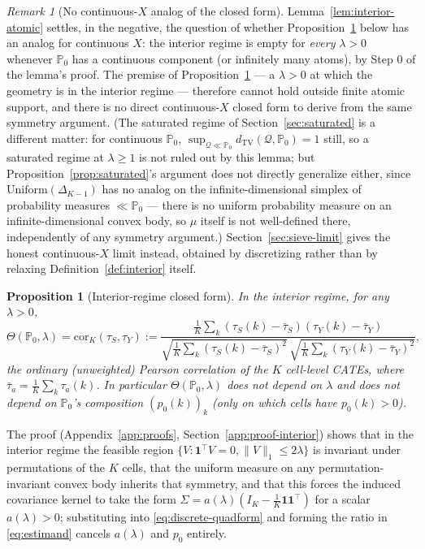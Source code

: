 \documentclass[11pt]{article}
\theoremstyle{plain}
\newtheorem{proposition}[theorem]{Proposition}
\theoremstyle{definition}
\theoremstyle{remark}
\newtheorem{remark}[theorem]{Remark}
\newcommand{\PP}{\mathbb{P}}
\newcommand{\Q}{\mathcal{Q}}
\newcommand{\Corr}{\mathrm{cor}}
\begin{document}
\begin{remark}[No continuous-$X$ analog of the closed form]\label{rem:no-continuous-interior}
Lemma~\ref{lem:interior-atomic} settles, in the negative, the question of whether
Proposition~\ref{prop:interior} below has an analog for continuous $X$: the interior
regime is empty for \emph{every} $\lambda>0$ whenever $\PP_0$ has a continuous
component (or infinitely many atoms), by Step 0 of the lemma's proof. The premise of
Proposition~\ref{prop:interior} --- a $\lambda>0$ at which the geometry is in the
interior regime --- therefore cannot hold outside finite atomic support, and there
is no direct continuous-$X$ closed form to derive from the same symmetry argument.
(The saturated regime of Section~\ref{sec:saturated} is a different matter: for
continuous $\PP_0$, $\sup_{\Q\ll\PP_0}d_{\mathrm{TV}}(\Q,\PP_0)=1$ still, so a
saturated regime at $\lambda\ge1$ is not ruled out by this lemma; but
Proposition~\ref{prop:saturated}'s argument does not directly generalize either,
since $\mathrm{Uniform}(\Delta_{K-1})$ has no analog on the infinite-dimensional
simplex of probability measures $\ll\PP_0$ --- there is no uniform probability
measure on an infinite-dimensional convex body, so $\mu$ itself is not well-defined
there, independently of any symmetry argument.) Section~\ref{sec:sieve-limit}
gives the honest continuous-$X$ limit instead, obtained by discretizing rather than
by relaxing Definition~\ref{def:interior} itself.
\end{remark}

\begin{proposition}[Interior-regime closed form]\label{prop:interior}
In the interior regime, for any $\lambda>0$,
\begin{equation}\label{eq:interior-reduction}
    \Theta(\PP_0,\lambda) = \Corr_K(\tau_S,\tau_Y)
    := \frac{\frac1K\sum_k(\tau_S(k)-\bar\tau_S)(\tau_Y(k)-\bar\tau_Y)}
            {\sqrt{\frac1K\sum_k(\tau_S(k)-\bar\tau_S)^2}\,\sqrt{\frac1K\sum_k(\tau_Y(k)-\bar\tau_Y)^2}},
\end{equation}
the ordinary (unweighted) Pearson correlation of the $K$ cell-level CATEs, where
$\bar\tau_a=\frac1K\sum_k\tau_a(k)$. In particular $\Theta(\PP_0,\lambda)$ does not
depend on $\lambda$ and does not depend on $\PP_0$'s composition $(p_0(k))_k$
(only on which cells have $p_0(k)>0$).
\end{proposition}

The proof (Appendix~\ref{app:proofs}, Section~\ref{app:proof-interior}) shows that in
the interior regime the feasible region $\{V:\mathbf1^\top V=0,\|V\|_1\le2\lambda\}$ is
invariant under permutations of the $K$ cells, that the uniform measure on any
permutation-invariant convex body inherits that symmetry, and that this forces the
induced covariance kernel to take the form $\Sigma=a(\lambda)(I_K-\tfrac1K\mathbf1\mathbf1^\top)$
for a scalar $a(\lambda)>0$; substituting into \eqref{eq:discrete-quadform} and forming
the ratio in \eqref{eq:estimand} cancels $a(\lambda)$ and $p_0$ entirely.
\end{document}
